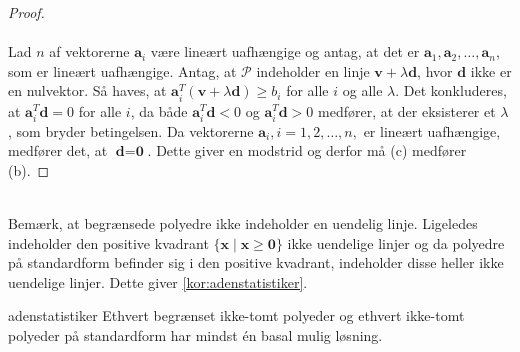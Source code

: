 \begin{proof}
\\\\
%
Lad $n$ af vektorerne $\textbf{a}_i$ være lineært uafhængige og antag, at det er $\textbf{a}_1, \textbf{a}_2, \ldots , \textbf{a}_n$, som er lineært uafhængige.
Antag, at $\mathcal{P}$ indeholder en linje $\textbf{v} + \lambda \textbf{d}$, hvor $\textbf{d}$ ikke er en nulvektor.
Så haves, at $\textbf{a}_i^T (\textbf{v} + \lambda \textbf{d}) \geq b_i$ for alle $i$ og alle $\lambda$.
Det konkluderes, at $\textbf{a}_i^T \textbf{d} = 0$ for alle $i$, da både  $\textbf{a}_i^T \textbf{d} < 0$ og  $\textbf{a}_i^T \textbf{d} > 0$ medfører, at der eksisterer et $\lambda$, som bryder betingelsen.
Da vektorerne $\textbf{a}_i, i = 1, 2, \ldots, n,$ er lineært uafhængige, medfører det, at $\textbf{d}=\textbf{0}$.
Dette giver en modstrid og derfor må (c) medfører (b).
\end{proof}\\
%
Bemærk, at begrænsede polyedre ikke indeholder en uendelig linje.
Ligeledes indeholder den positive kvadrant $\{ \textbf{x} \mid \textbf{x} \geq \textbf{0}\}$ ikke uendelige linjer og da polyedre på standardform befinder sig i den positive kvadrant, indeholder disse heller ikke uendelige linjer.
Dette giver \ref{kor:adenstatistiker}.
\begin{kor}{}{adenstatistiker}
Ethvert begrænset ikke-tomt polyeder og ethvert ikke-tomt polyeder på standardform har mindst én basal mulig løsning.
\end{kor}
